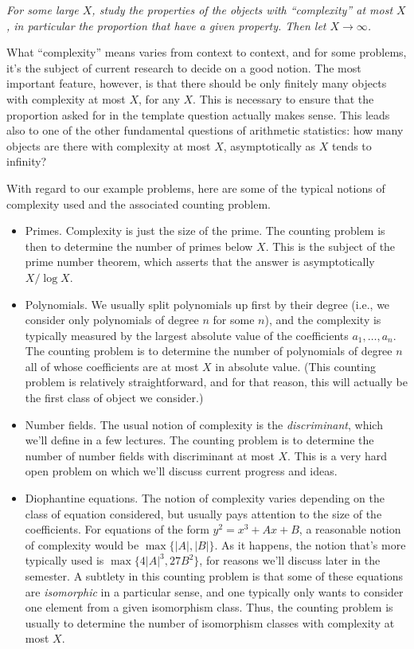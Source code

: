 \documentclass[12pt]{amsart}
\theoremstyle{definition} \newtheorem*{notation}{Notation}
\theoremstyle{remark} \newtheorem*{remark}{Remark}
\numberwithin{equation}{section}
\numberwithin{theorem}{section}
\begin{document}
		\begin{center}
		\emph{For some large $X$, study the properties of the objects with ``complexity'' at most $X$, in particular the proportion that have a given property.  Then let $X \to \infty$.}
		\end{center}
	
	What ``complexity'' means varies from context to context, and for some problems, it's the subject of current research to decide on a good notion.  The most important feature, however, is that there should be only finitely many objects with complexity at most $X$, for any $X$.  This is necessary to ensure that the proportion asked for in the template question actually makes sense.  This leads also to one of the other fundamental questions of arithmetic statistics: how many objects are there with complexity at most $X$, asymptotically as $X$ tends to infinity?
	
	With regard to our example problems, here are some of the typical notions of complexity used and the associated counting problem.
	
		\begin{itemize}
			\item Primes. Complexity is just the size of the prime.  The counting problem is then to determine the number of primes below $X$.  This is the subject of the prime number theorem, which asserts that the answer is asymptotically $X / \log X$.
			\item Polynomials.  We usually split polynomials up first by their degree (i.e., we consider only polynomials of degree $n$ for some $n$), and the complexity is typically measured by the largest absolute value of the coefficients $a_1,\dots,a_n$.  The counting problem is to determine the number of polynomials of degree $n$ all of whose coefficients are at most $X$ in absolute value.  (This counting problem is relatively straightforward, and for that reason, this will actually be the first class of object we consider.)
			\item Number fields.  The usual notion of complexity is the \emph{discriminant}, which we'll define in a few lectures.  The counting problem is to determine the number of number fields with discriminant at most $X$.  This is a very hard open problem on which we'll discuss current progress and ideas.
			\item Diophantine equations.  The notion of complexity varies depending on the class of equation considered, but usually pays attention to the size of the coefficients.  For equations of the form $y^2 = x^3+Ax+B$, a reasonable notion of complexity would be $\max\{|A|,|B|\}$.  As it happens, the notion that's more typically used is $\max\{4|A|^3, 27B^2\}$, for reasons we'll discuss later in the semester.  A subtlety in this counting problem is that some of these equations are \emph{isomorphic} in a particular sense, and one typically only wants to consider one element from a given isomorphism class.  Thus, the counting problem is usually to determine the number of isomorphism classes with complexity at most $X$.
		\end{itemize}
	
\end{document}

